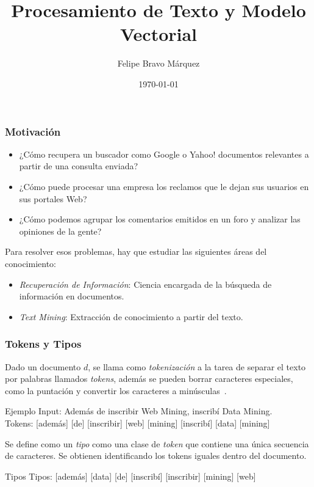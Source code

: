 \documentclass[mathserif]{beamer}
\date{\today}
\title{Procesamiento de Texto y Modelo Vectorial}
\author[F.Bravo-Marquez]{Felipe Bravo Márquez}
\begin{document}
\begin{frame}
\titlepage
\end{frame}

\begin{frame}\frametitle{Motivación}


  \begin{itemize}
   \item ¿Cómo recupera un buscador como Google o Yahoo! documentos relevantes a partir de una consulta enviada?
   \item ¿Cómo puede procesar una empresa los reclamos que le dejan sus usuarios en sus portales Web?
   \item ¿Cómo podemos agrupar los comentarios emitidos en un foro y analizar las opiniones de la gente?
  \end{itemize}



Para resolver esos problemas, hay que estudiar las siguientes áreas del conocimiento:

\begin{itemize}
 \item \emph{Recuperación de Información}: Ciencia encargada de la búsqueda de información en documentos.
 \item \emph{Text Mining}: Extracción de conocimiento a partir del texto.
\end{itemize}



\end{frame}

\begin{frame}\frametitle{Tokens y Tipos}
{\footnotesize
Dado un documento $d$, se llama como \emph{tokenización} a la tarea de separar el texto por palabras llamados \emph{tokens}, además se pueden borrar caracteres especiales, como la puntación y convertir los caracteres a minúsculas~\cite{manning2008}. 

\begin{block}{Ejemplo}
Input: Además de inscribir Web Mining, inscribí Data Mining.\\
Tokens: [además] [de] [inscribir] [web] [mining] [inscribí] [data] [mining]
\end{block}

Se define como un \emph{tipo} como una clase de \emph{token} que contiene una única secuencia de caracteres.
Se obtienen identificando los tokens iguales dentro del documento.

\begin{block}{Tipos}
Tipos: [además] [data] [de] [inscribí] [inscribir] [mining] [web]   \\
\end{block}



 }
\end{frame}
\end{document}
